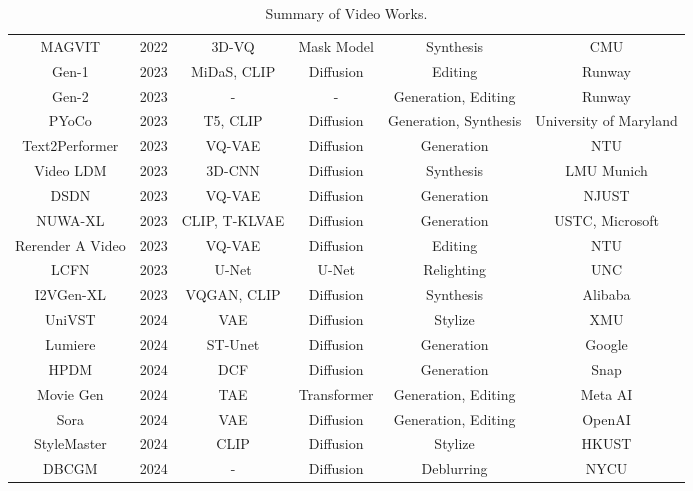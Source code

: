 \begin{table*}[htbp]
\begin{tabular}{cccccc}
     		MAGVIT	        & 2022 &	3D-VQ	    &    Mask Model	  &  Synthesis	          &    CMU               \\
     		Gen-1	        & 2023 &  MiDaS, CLIP	&    Diffusion	  &   Editing	          &   Runway             \\
     		Gen-2	        & 2023 &      -	        &        -	      & Generation, Editing	  &   Runway             \\
     		PYoCo	        & 2023 &   T5, CLIP	    &    Diffusion	  & Generation, Synthesis &	University of Maryland \\
     		Text2Performer	& 2023 &	VQ-VAE	    &    Diffusion	  & Generation	          &    NTU               \\
     		Video LDM	    & 2023 &	3D-CNN	    &    Diffusion	  & Synthesis	          &  LMU Munich          \\
     		DSDN	        & 2023 & 	VQ-VAE	    &    Diffusion	  & Generation	          &    NJUST             \\
     		NUWA-XL	        & 2023 &  CLIP, T-KLVAE	&    Diffusion	  & Generation	          & USTC, Microsoft      \\
     		Rerender A Video& 2023 &	VQ-VAE	    &    Diffusion	  &   Editing	          &    NTU               \\
     		LCFN	        & 2023 &	U-Net	    &      U-Net	  & Relighting	          &    UNC               \\
     		I2VGen-XL	    & 2023 &	VQGAN, CLIP	&    Diffusion	  & Synthesis	          &   Alibaba            \\
     		UniVST	        & 2024 &	VAE	        &    Diffusion	  &   Stylize	          &    XMU               \\
     		Lumiere	        & 2024 &   ST-Unet	    &    Diffusion	  & Generation	          &   Google             \\
     		HPDM	        & 2024 & 	DCF	        &    Diffusion	  & Generation	          &    Snap              \\
     		Movie Gen	    & 2024 & 	TAE	        &   Transformer	  & Generation, Editing	  &   Meta AI            \\
     		Sora	        & 2024 &    VAE	        &    Diffusion	  & Generation, Editing	  &   OpenAI             \\
     		StyleMaster	    & 2024 &    CLIP	    &    Diffusion	  &   Stylize	          &    HKUST             \\
     		DBCGM	        & 2024 &     -	        &    Diffusion	  & Deblurring            & 	NYCU             \\
     		
     		\bottomrule
     	\end{tabular}
     	\caption{Summary of Video Works.}
     	\label{tab : table 1}
     \end{table*}